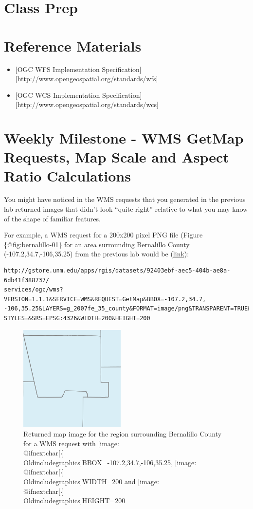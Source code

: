 \documentclass[]{book}
\makeatletter
\def\ScaleIfNeeded{%
  \ifdim\Gin@nat@width>.5\linewidth
    .5\linewidth
  \else
    \Gin@nat@width
  \fi
}
\let\Oldincludegraphics\texttt{[image: \%
 \\catcode`\\@=11\\relax\%
 \%\\gdef\\includegraphics\{\\@ifnextchar[\{\\Oldincludegraphics]}{\Oldincludegraphics[width=\ScaleIfNeeded]}}%
\gdef\texttt{[image: \\@ifnextchar[\{\\Oldincludegraphics]}{\Oldincludegraphics[max size={.75\textwidth}{.75\textheight}]}}%
\makeatother
\begin{document}
\section{Class Prep}\label{week07-prep}

\section{Reference Materials}\label{week07-reference}

\begin{itemize}
\item
  {[}OGC WFS Implementation
  Specification{]}{[}http://www.opengeospatial.org/standards/wfs{]}
\item
  {[}OGC WCS Implementation
  Specification{]}{[}http://www.opengeospatial.org/standards/wcs{]}
\end{itemize}

\section{Weekly Milestone - WMS GetMap Requests, Map Scale and Aspect
Ratio Calculations}\label{week07-milestone}

You might have noticed in the WMS requests that you generated in the
previous lab returned images that didn't look ``quite right'' relative
to what you may know of the shape of familiar features.

For example, a WMS request for a 200x200 pixel PNG file (Figure
\{@fig:bernalillo-01\} for an area surrounding Bernalillo County
(-107.2,34.7,-106,35.25) from the previous lab would be
(\href{http://gstore.unm.edu/apps/rgis/datasets/92403ebf-aec5-404b-ae8a-6db41f388737/services/ogc/wms?VERSION=1.1.1\&SERVICE=WMS\&REQUEST=GetMap\&BBOX=-107.2,34.7,-106,35.25\&LAYERS=g_2007fe_35_county\&FORMAT=image/png\&TRANSPARENT=TRUE\&STYLES=\&SRS=EPSG:4326\&WIDTH=200\&HEIGHT=200}{link}):

\begin{verbatim}
http://gstore.unm.edu/apps/rgis/datasets/92403ebf-aec5-404b-ae8a-6db41f388737/
services/ogc/wms?VERSION=1.1.1&SERVICE=WMS&REQUEST=GetMap&BBOX=-107.2,34.7,
-106,35.25&LAYERS=g_2007fe_35_county&FORMAT=image/png&TRANSPARENT=TRUE&
STYLES=&SRS=EPSG:4326&WIDTH=200&HEIGHT=200
\end{verbatim}

\begin{figure}[htbp]
\centering
\includegraphics{images/bernalillo_01.png}
\caption{Returned map image for the region surrounding Bernalillo County
for a WMS request with \texttt{BBOX=-107.2,34.7,-106,35.25},
\texttt{WIDTH=200} and \texttt{HEIGHT=200}}
\end{figure}
\end{document}

